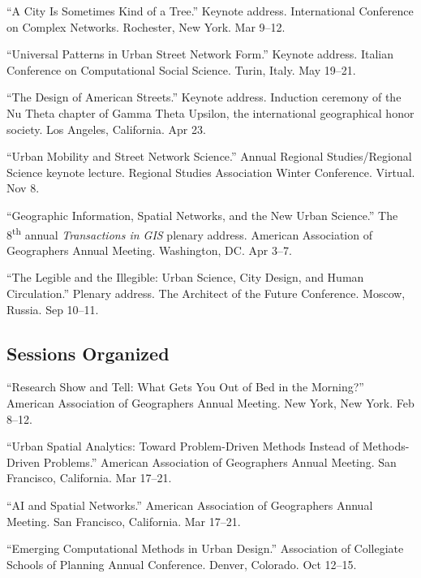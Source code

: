 \documentclass[11pt,letterpaper]{report} %
\begin{document}
\begin{tablist}

\item[2027] \tab{}\enquote{A City Is Sometimes Kind of a Tree.} Keynote address. International Conference on Complex Networks. Rochester, New York. Mar 9--12.

\item[2026] \tab{}\enquote{Universal Patterns in Urban Street Network Form.} Keynote address. Italian Conference on Computational Social Science. Turin, Italy. May 19--21.

\item[2024] \tab{}\enquote{The Design of American Streets.} Keynote address. Induction ceremony of the Nu Theta chapter of Gamma Theta Upsilon, the international geographical honor society. Los Angeles, California. Apr 23.

\item[2021] \tab{}\enquote{Urban Mobility and Street Network Science.} Annual Regional Studies/Regional Science keynote lecture. Regional Studies Association Winter Conference. Virtual. Nov 8.

\item[2019] \tab{}\enquote{Geographic Information, Spatial Networks, and the New Urban Science.} The 8\textsuperscript{th} annual \textit{Transactions in GIS} plenary address. American Association of Geographers Annual Meeting. Washington, DC\@. Apr 3--7.

\item[2018] \tab{}\enquote{The Legible and the Illegible: Urban Science, City Design, and Human Circulation.} Plenary address. The Architect of the Future Conference. Moscow, Russia. Sep 10--11.

\end{tablist}

\subsection*{Sessions Organized}

\begin{tablist}

\item[2027] \tab{}\enquote{Research Show and Tell: What Gets You Out of Bed in the Morning?} American Association of Geographers Annual Meeting. New York, New York. Feb 8--12.

\item[2026] \tab{}\enquote{Urban Spatial Analytics: Toward Problem-Driven Methods Instead of Methods-Driven Problems.} American Association of Geographers Annual Meeting. San Francisco, California. Mar 17--21.

\item[2026] \tab{}\enquote{AI and Spatial Networks.} American Association of Geographers Annual Meeting. San Francisco, California. Mar 17--21.

\item[2017] \tab{}\enquote{Emerging Computational Methods in Urban Design.} Association of Collegiate Schools of Planning Annual Conference. Denver, Colorado. Oct 12--15.

\end{tablist}
\end{document}
